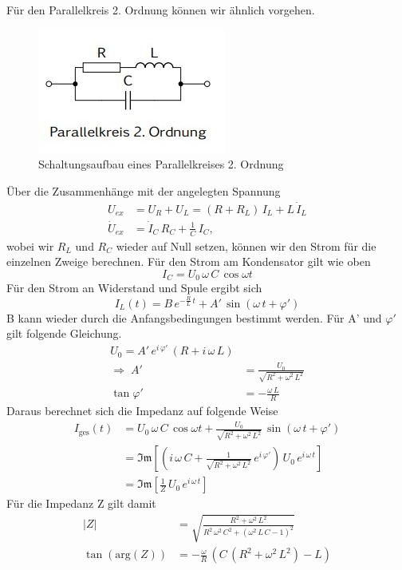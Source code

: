 \documentclass[a4paper, 12pt,]{scrartcl}
\begin{document}
Für den Parallelkreis 2. Ordnung können wir ähnlich vorgehen.
\begin{figure}[H]\centering\includegraphics[scale=1]{PK 2}\caption{Schaltungsaufbau eines Parallelkreises 2. Ordnung}\end{figure}
Über die Zusammenhänge mit der angelegten Spannung
\begin{align*}U_{ex}&=U_R+U_L=(R+R_L)\,I_L+L\,\dot{I}_L\\
\dot{U}_{ex}&=\dot{I}_C\,R_C+\frac{1}{C}\,I_C,\end{align*}
wobei wir $R_L$ und $R_C$ wieder auf Null setzen, können wir den Strom für die einzelnen Zweige berechnen. Für den Strom am Kondensator gilt wie oben
\begin{equation*}I_C=U_0\,\omega\,C\,\cos\omega{t}\end{equation*}
Für den Strom an Widerstand und Spule ergibt sich
\begin{equation*}I_L(t)=B\,e^{-\frac{R}{L}\,t}+A'\,\sin(\omega\,t+\varphi')\end{equation*}
B kann wieder durch die Anfangsbedingungen bestimmt werden. Für A' und $\varphi'$ gilt folgende Gleichung.
\begin{align*}U_0=A'\,e^{i\,\varphi'}\,(R+i\,\omega\,L)\\
\Rightarrow\;A'&=\frac{U_0}{\sqrt{R^2+\omega^2\,L^2}}\\
\tan\varphi'&=-\frac{\omega\,L}{R}\end{align*}
Daraus berechnet sich die Impedanz auf folgende Weise
\begin{align*}I_\text{ges}(t)&=U_0\,\omega\,C\,\cos\omega{t}+\frac{U_0}{\sqrt{R^2+\omega^2\,L^2}}\,\sin(\omega\,t+\varphi')\\
&=\mathfrak{Im}\left[\left(i\,\omega\,C+\frac{1}{\sqrt{R^2+\omega^2\,L^2}}\,e^{i\,\varphi'}\right)\,U_0\,e^{i\,\omega\,t}\right]\\
&=\mathfrak{Im}\left[\frac{1}{Z}\,U_0\,e^{i\,\omega\,t}\right]\end{align*}
Für die Impedanz Z gilt damit
\begin{align*}
|Z|&=\sqrt{\frac{R^2+\omega^2\,L^2}{R^2\,\omega^2\,C^2+(\omega^2\,L\,C-1)^2}}\\
\tan(\text{arg}(Z))&=-\frac{\omega}{R}\,(C\,(R^2+\omega^2\,L^2)-L)\end{align*}
\end{document}
